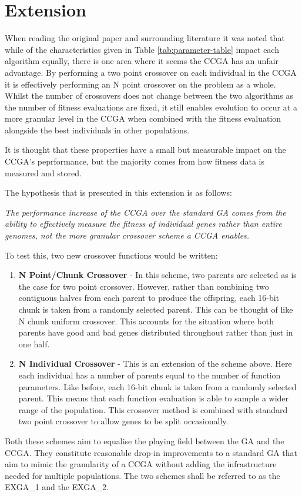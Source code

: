 \section{Extension} \label{sec:extension}

When reading the original paper and surrounding literature it was noted that while of the characteristics given in Table \ref{tab:parameter-table} impact each algorithm equally, there is one area where it seems the CCGA has an unfair advantage.
By performing a two point crossover on each individual in the CCGA it is effectively performing an N point crossover on the problem as a whole. 
Whilst the number of crossovers does not change between the two algorithms as the number of fitness evaluations are fixed, it still enables evolution to occur at a more granular level in the CCGA when combined with the fitness evaluation alongside the best individuals in other populations.

It is thought that these properties have a small but measurable impact on the CCGA's peprformance, but the majority comes from how fitness data is measured and stored.


The hypothesis that is presented in this extension is as follows:

\emph{The performance increase of the CCGA over the standard GA comes from the ability to effectively measure the fitness of individual genes rather than entire genomes, not the more granular crossover scheme a CCGA enables.} 

To test this, two new crossover functions would be written:
\begin{enumerate}
    \item \textbf{N Point/Chunk Crossover} - In this scheme, two parents are selected as is the case for two point crossover. However, rather than combining two contiguous halves from each parent to produce the offspring, each 16-bit chunk is taken from a randomly selected parent. 
    This can be thought of like N chunk uniform crossover.
    This accounts for the situation where both parents have good and bad genes distributed throughout rather than just in one half.

    \item \textbf{N Individual Crossover} -  This is an extension of the scheme above.
    Here each individual has a number of parents equal to the number of function parameters.
    Like before, each 16-bit chunk is taken from a randomly selected parent.
    This means that each function evaluation is able to sample a wider range of the population.
    This crossover method is combined with standard two point crossover to allow genes to be split occasionally.
\end{enumerate}

Both these schemes aim to equalise the playing field between the GA and the CCGA. 
They constitute reasonable drop-in improvements to a standard GA that aim to mimic the granularity of a CCGA without adding the infrastructure needed for multiple populations.
The two schemes shall be referred to as the EXGA\_1 and the EXGA\_2.
